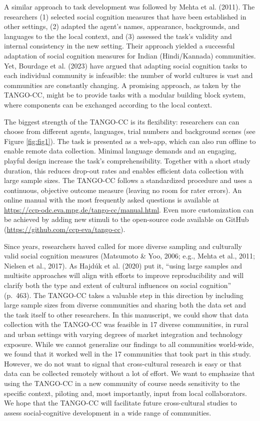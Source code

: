 \documentclass[
  man,mask,floatsintext]{apa7}
\begin{document}
A similar approach to task development was followed by Mehta et al. (2011). The researchers (1) selected social cognition measures that have been established in other settings, (2) adapted the agent's names, appearance, backgrounds, and languages to the the local context, and (3) assessed the task's validity and internal consistency in the new setting. Their approach yielded a successful adaptation of social cognition measures for Indian (Hindi/Kannada) communities. Yet, Bourdage et al. (2023) have argued that adapting social cognition tasks to each individual community is infeasible: the number of world cultures is vast and communities are constantly changing. A promising approach, as taken by the TANGO-CC, might be to provide tasks with a modular building block system, where components can be exchanged according to the local context.

The biggest strength of the TANGO-CC is its flexibility: researchers can can choose from different agents, languages, trial numbers and background scenes (see Figure \ref{fig:fig1}). The task is presented as a web-app, which can also run offline to enable remote data collection. Minimal language demands and an engaging, playful design increase the task's comprehensibility. Together with a short study duration, this reduces drop-out rates and enables efficient data collection with large sample sizes. The TANGO-CC follows a standardized procedure and uses a continuous, objective outcome measure (leaving no room for rater errors). An online manual with the most frequently asked questions is available at \url{https://ccp-odc.eva.mpg.de/tango-cc/manual.html}. Even more customization can be achieved by adding new stimuli to the open-source code available on GitHub (\url{https://github.com/ccp-eva/tango-cc}).

Since years, researchers haved called for more diverse sampling and culturally valid social cognition measures (Matsumoto \& Yoo, 2006; e.g., Mehta et al., 2011; Nielsen et al., 2017). As Hajdúk et al. (2020) put it, ``using large samples and multisite approaches will align with efforts to improve reproducibility and will clarify both the type and extent of cultural influences on social cognition'' (p.~463). The TANGO-CC takes a valuable step in this direction by including large sample sizes from diverse communities and sharing both the data set and the task itself to other researchers. In this manuscript, we could show that data collection with the TANGO-CC was feasible in 17 diverse communities, in rural and urban settings with varying degrees of market integration and technology exposure. While we cannot generalize our findings to all communities world-wide, we found that it worked well in the 17 communities that took part in this study. However, we do not want to signal that cross-cultural research is easy or that data can be collected remotely without a lot of effort. We want to emphasize that using the TANGO-CC in a new community of course needs sensitivity to the specific context, piloting and, most importantly, input from local collaborators. We hope that the TANGO-CC will facilitate future cross-cultural studies to assess social-cognitive development in a wide range of communities.
\end{document}
